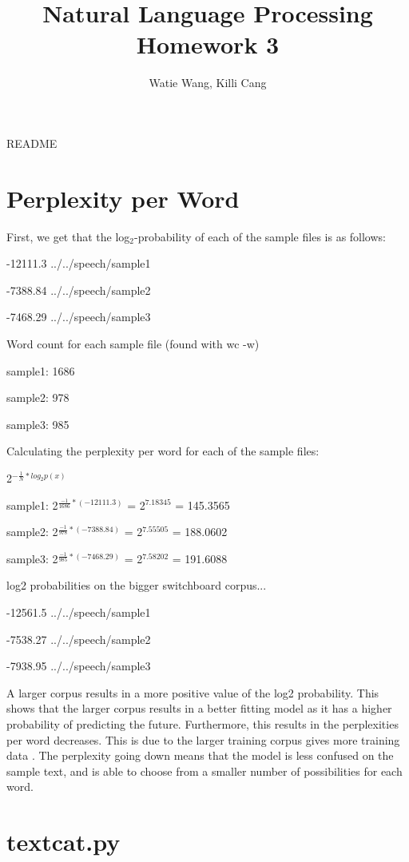 \documentclass[12pt, letterpaper]{article}
\title{Natural Language Processing Homework 3}
\author{Watie Wang, Killi Cang}
\begin{document}
\maketitle

README

\section{Perplexity per Word}
First, we get that the log$_{2}$-probability of each of the sample files is as follows:

-12111.3	../../speech/sample1

-7388.84	../../speech/sample2

-7468.29	../../speech/sample3

Word count for each sample file (found with wc -w)

sample1: 1686

sample2: 978
     
sample3: 985

Calculating the perplexity per word for each of the sample files:

2$^{-\frac{1}{N}*log_{2}p(x)}$

sample1: 2$^{\frac{-1}{1686} * (-12111.3)}$ = 2$^{7.18345}$ = 145.3565

sample2: 2$^{\frac{-1}{978} * (-7388.84)}$ = 2$^{7.55505}$ = 188.0602

sample3: 2$^{\frac{-1}{985} * (-7468.29)}$ = 2$^{7.58202}$ = 191.6088

log2 probabilities on the bigger switchboard corpus...

-12561.5	../../speech/sample1

-7538.27	../../speech/sample2

-7938.95	../../speech/sample3

A larger corpus results in a more positive value of the log2 probability. This shows that the larger corpus results in a better fitting model as it has a higher probability of predicting the future. Furthermore, this results in the perplexities per word decreases. This is due to the larger training corpus gives more training data . The perplexity going down means that the model is less confused on the sample text, and is able to choose from a smaller number of possibilities for each word.

\section{textcat.py}
\end{document}
